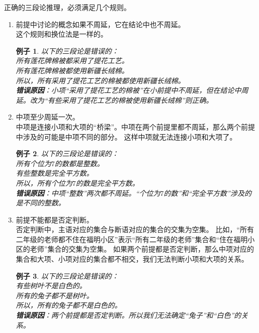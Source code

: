 \documentclass[12pt,UTF8]{ctexbook}
\newtheorem*{ex*}{例子}
\begin{document}
正确的三段论推理，必须满足几个规则。
\begin{enumerate}
    \item[1.] 前提中讨论的概念如果不周延，它在结论中也不周延。\\
    这个规则和换位法是一样的。
    \begin{ex*}
        以下的三段论是错误的： \\
        \indent 所有莲花牌棉被都采用了提花工艺。\\
        \indent 所有莲花牌棉被都使用新疆长绒棉。\\
        \indent 所以，所有采用了提花工艺的棉被都使用新疆长绒棉。\\
        \textbf{错误原因}：小项“采用了提花工艺的棉被”在小前提中不周延，但在结论中周延。改为“有些采用了提花工艺的棉被使用新疆长绒棉”则正确。
    \end{ex*}
    \item[2.] 中项至少周延一次。\\
    中项是连接小项和大项的“桥梁”。中项在两个前提里都不周延，那么两个前提中涉及的可能是中项不同的部分。
    这样中项就无法连接小项和大项了。 
    \begin{ex*}
        以下的三段论是错误的： \\
        \indent 所有个位为$7$的数都是整数。\\
        \indent 有些整数是完全平方数。\\
        \indent 所以，所有个位为$7$的数是完全平方数。\\
        \textbf{错误原因}：中项“整数”两次都不周延。“个位为$7$的数”和“完全平方数”涉及的是不同的整数。
    \end{ex*}    
    \item[3.] 前提不能都是否定判断。\\
    否定判断中，主语对应的集合与断语对应的集合的交集为空集。
    比如，“所有二年级的老师都不住在福明小区”表示“所有二年级的老师”集合和“住在福明小区的老师”集合的交集为空集。
    如果两个前提都是否定判断，那么中项对应的集合和大项、小项对应的集合都不相交，我们无法判断小项和大项的关系。
    \begin{ex*}
        以下的三段论是错误的： \\
        \indent 有些树叶不是白色的。\\
        \indent 所有的兔子都不是树叶。\\
        \indent 所以，所有的兔子都不是白色的。\\
        \textbf{错误原因}：两个前提都是否定判断。所以我们无法确定“兔子”和“白色”的关系。
    \end{ex*} 

\end{enumerate}
\end{document}
